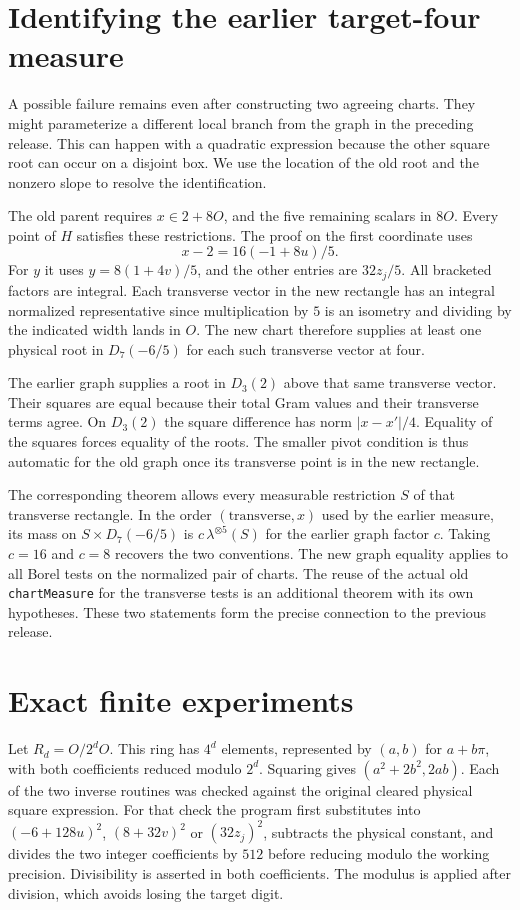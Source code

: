 \documentclass[12pt,letterpaper]{article}
\newcommand{\id}[1]{{\small\nolinkurl{#1}}}
\begin{document}
\section{Identifying the earlier target-four measure}
A possible failure remains even after constructing two agreeing charts. They might parameterize a different local branch from the graph in the preceding release. This can happen with a quadratic expression because the other square root can occur on a disjoint box. We use the location of the old root and the nonzero slope to resolve the identification.

The old parent requires $x\in2+8O$, and the five remaining scalars in $8O$. Every point of $H$ satisfies these restrictions. The proof on the first coordinate uses
\[
 x-2=16(-1+8u)/5.
\]
For $y$ it uses $y=8(1+4v)/5$, and the other entries are $32z_j/5$. All bracketed factors are integral. Each transverse vector in the new rectangle has an integral normalized representative since multiplication by $5$ is an isometry and dividing by the indicated width lands in $O$. The new chart therefore supplies at least one physical root in $D_7(-6/5)$ for each such transverse vector at four.

The earlier graph supplies a root in $D_3(2)$ above that same transverse vector. Their squares are equal because their total Gram values and their transverse terms agree. On $D_3(2)$ the square difference has norm $|x-x'|/4$. Equality of the squares forces equality of the roots. The smaller pivot condition is thus automatic for the old graph once its transverse point is in the new rectangle.

The corresponding theorem allows every measurable restriction $S$ of that transverse rectangle. In the order $(\text{transverse},x)$ used by the earlier measure, its mass on $S\times D_7(-6/5)$ is $c\,\lambda^{\otimes5}(S)$ for the earlier graph factor $c$. Taking $c=16$ and $c=8$ recovers the two conventions. The new graph equality applies to all Borel tests on the normalized pair of charts. The reuse of the actual old \id{chartMeasure} for the transverse tests is an additional theorem with its own hypotheses. These two statements form the precise connection to the previous release.

\section{Exact finite experiments}
Let $R_d=O/2^dO$. This ring has $4^d$ elements, represented by $(a,b)$ for $a+b\pi$, with both coefficients reduced modulo $2^d$. Squaring gives $(a^2+2b^2,2ab)$. Each of the two inverse routines was checked against the original cleared physical square expression. For that check the program first substitutes into $(-6+128u)^2$, $(8+32v)^2$ or $(32z_j)^2$, subtracts the physical constant, and divides the two integer coefficients by $512$ before reducing modulo the working precision. Divisibility is asserted in both coefficients. The modulus is applied after division, which avoids losing the target digit.
\end{document}

